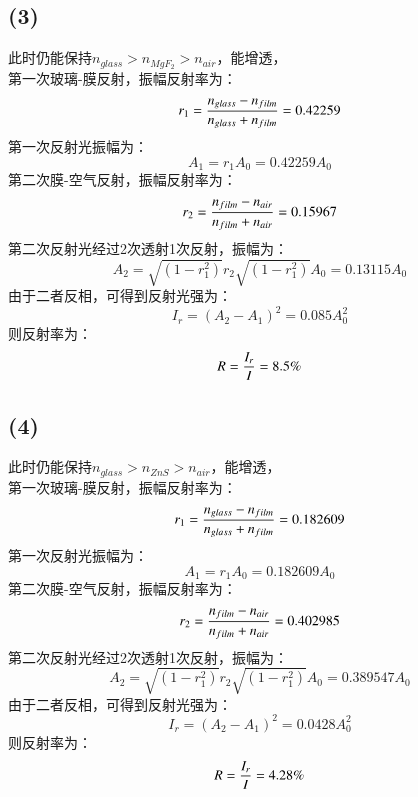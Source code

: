 \documentclass[UTF8,9pt]{ctexart}
\begin{document}
\subsection{(3)}
此时仍能保持$n_{glass}>n_{MgF_2}>n_{air}$，能增透，\\
第一次玻璃-膜反射，振幅反射率为：
$$r_1=\frac{n_{glass}-n_{film}}{n_{glass}+n_{film}}=0.42259$$
第一次反射光振幅为：
$$A_1=r_1A_0=0.42259A_0$$
第二次膜-空气反射，振幅反射率为：
$$r_2=\frac{n_{film}-n_{air}}{n_{film}+n_{air}}=0.15967$$
第二次反射光经过2次透射1次反射，振幅为：
$$A_2=\sqrt{(1-r_1^2)}r_2\sqrt{(1-r_1^2)}A_0=0.13115A_0$$
由于二者反相，可得到反射光强为：
$$I_r=(A_2-A_1)^2=0.085A_0^2$$
则反射率为：
$$R=\frac{I_r}{I}=8.5\%$$
\subsection{(4)}
此时仍能保持$n_{glass}>n_{ZnS}>n_{air}$，能增透，\\
第一次玻璃-膜反射，振幅反射率为：
$$r_1=\frac{n_{glass}-n_{film}}{n_{glass}+n_{film}}=0.182609$$
第一次反射光振幅为：
$$A_1=r_1A_0=0.182609A_0$$
第二次膜-空气反射，振幅反射率为：
$$r_2=\frac{n_{film}-n_{air}}{n_{film}+n_{air}}=0.402985$$
第二次反射光经过2次透射1次反射，振幅为：
$$A_2=\sqrt{(1-r_1^2)}r_2\sqrt{(1-r_1^2)}A_0=0.389547A_0$$
由于二者反相，可得到反射光强为：
$$I_r=(A_2-A_1)^2=0.0428A_0^2$$
则反射率为：
$$R=\frac{I_r}{I}=4.28\%$$
\end{document}
